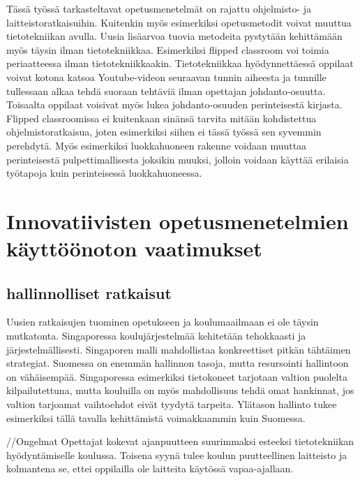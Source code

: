 \documentclass[utf8,bachelor]{gradu3}
\begin{document}
Tässä työssä tarkasteltavat opetusmenetelmät on rajattu ohjelmisto- ja laitteistoratkaisuihin. Kuitenkin myös esimerkiksi opetusmetodit voivat muuttua tietotekniikan avulla. Uusia lisäarvoa tuovia metodeita pystytään kehittämään myös täysin ilman tietotekniikkaa. Esimerkiksi flipped classroom voi toimia periaatteessa ilman tietotekniikkaakin. Tietotekniikkaa hyödynnettäessä oppilaat voivat kotona katsoa Youtube-videon seuraavan tunnin aiheesta ja tunnille tullessaan alkaa tehdä suoraan tehtäviä ilman opettajan johdanto-osuutta. Toisaalta oppilaat voisivat myös lukea johdanto-osuuden perinteisestä kirjasta. Flipped classroomissa ei kuitenkaan sinänsä tarvita mitään kohdistettua ohjelmistoratkaisua, joten esimerkiksi siihen ei tässä työssä sen syvemmin perehdytä. \parencite[][]{flipped} Myös esimerkiksi luokkahuoneen rakenne voidaan muuttaa perinteisestä pulpettimallisesta joksikin muuksi, jolloin voidaan käyttää erilaisia työtapoja kuin perinteisessä luokkahuoneessa.


\section{Innovatiivisten opetusmenetelmien käyttöönoton vaatimukset}

\subsection{hallinnolliset ratkaisut}
Uusien ratkaisujen tuominen opetukseen ja koulumaailmaan ei ole täysin mutkatonta. Singaporessa koulujärjestelmää kehitetään tehokkaasti ja järjestelmällisesti. Singaporen malli mahdollistaa konkreettiset pitkän tähtäimen strategiat. Suomessa on enemmän hallinnon tasoja, mutta resursointi hallintoon on vähäisempää. Singaporessa esimerkiksi tietokoneet tarjotaan valtion puolelta kilpailutettuna, mutta kouluilla on myös mahdollisuus tehdä omat hankinnat, jos valtion tarjoamat vaihtoehdot eivät tyydytä tarpeita. Ylätason hallinto tukee esimerkiksi tällä tavalla kehittämistä voimakkaammin kuin Suomessa. \parencite[][]{koulunArki} 

//Ongelmat
Opettajat kokevat ajanpuutteen suurimmaksi esteeksi tietotekniikan hyödyntämiselle koulussa. Toisena syynä tulee koulun puutteellinen laitteisto ja kolmantena se, ettei oppilailla ole laitteita käytössä vapaa-ajallaan. \parencite[][]{sites}

\end{document}
